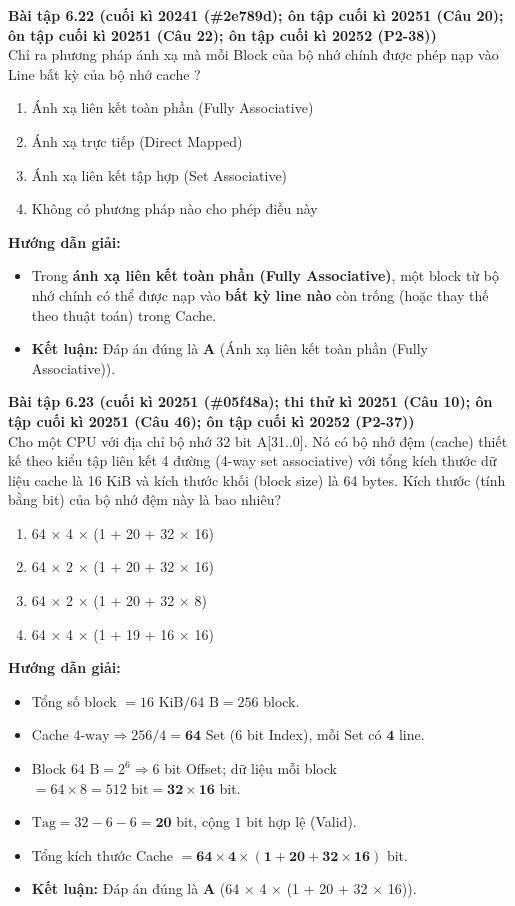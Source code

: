 \textbf{Bài tập 6.22 (cuối kì 20241 (\#2e789d); ôn tập cuối kì 20251 (Câu 20); ôn tập cuối kì 20251 (Câu 22); ôn tập cuối kì 20252 (P2-38))}\\
Chỉ ra phương pháp ánh xạ mà mỗi Block của bộ nhớ chính được phép nạp vào Line bất kỳ của bộ nhớ cache ?
\begin{enumerate}[label=\Alph*.]
    \item Ánh xạ liên kết toàn phần (Fully Associative)
    \item Ánh xạ trực tiếp (Direct Mapped)
    \item Ánh xạ liên kết tập hợp (Set Associative)
    \item Không có phương pháp nào cho phép điều này
\end{enumerate}
\textbf{Hướng dẫn giải:}
\begin{itemize}
    \item Trong \textbf{ánh xạ liên kết toàn phần (Fully Associative)}, một block từ bộ nhớ chính có thể được nạp vào \textbf{bất kỳ line nào} còn trống (hoặc thay thế theo thuật toán) trong Cache.
    \item \textbf{Kết luận:} Đáp án đúng là \textbf{A} (Ánh xạ liên kết toàn phần (Fully Associative)).
\end{itemize}

\textbf{Bài tập 6.23 (cuối kì 20251 (\#05f48a); thi thử kì 20251 (Câu 10); ôn tập cuối kì 20251 (Câu 46); ôn tập cuối kì 20252 (P2-37))}\\
Cho một CPU với địa chỉ bộ nhớ 32 bit A[31..0]. Nó có bộ nhớ đệm (cache) thiết kế theo kiểu tập liên kết 4 đường (4-way set associative) với tổng kích thước dữ liệu cache là 16 KiB và kích thước khối (block size) là 64 bytes. Kích thước (tính bằng bit) của bộ nhớ đệm này là bao nhiêu?
\begin{enumerate}[label=\Alph*.]
    \item 64 $\times$ 4 $\times$ (1 + 20 + 32 $\times$ 16)
    \item 64 $\times$ 2 $\times$ (1 + 20 + 32 $\times$ 16)
    \item 64 $\times$ 2 $\times$ (1 + 20 + 32 $\times$ 8)
    \item 64 $\times$ 4 $\times$ (1 + 19 + 16 $\times$ 16)
\end{enumerate}
\textbf{Hướng dẫn giải:}
\begin{itemize}
    \item Tổng số block $= 16\text{ KiB} / 64\text{ B} = 256$ block.
    \item Cache $4\text{-way} \Rightarrow 256 / 4 = \mathbf{64}$ Set ($6$ bit Index), mỗi Set có $\mathbf{4}$ line.
    \item Block $64\text{ B} = 2^6 \Rightarrow 6$ bit Offset; dữ liệu mỗi block $= 64 \times 8 = 512\text{ bit} = \mathbf{32 \times 16}$ bit.
    \item $\text{Tag} = 32 - 6 - 6 = \mathbf{20}$ bit, cộng $1$ bit hợp lệ (Valid).
    \item Tổng kích thước Cache $= \mathbf{64 \times 4 \times (1 + 20 + 32 \times 16)}$ bit.
    \item \textbf{Kết luận:} Đáp án đúng là \textbf{A} (64 $\times$ 4 $\times$ (1 + 20 + 32 $\times$ 16)).
\end{itemize}

